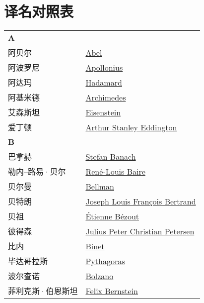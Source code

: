 \chapter{译名对照表}
\def\InsertTable#1{\begin{longtable}{ll} #1 \end{longtable}}%
\InsertTable{
	\textbf{A} \\
	阿贝尔 & \href{https://mathshistory.st-andrews.ac.uk/Biographies/Abel/}{Abel} \\
	阿波罗尼 & \href{https://mathshistory.st-andrews.ac.uk/Biographies/Apollonius/}{Apollonius} \\
	阿达玛 & \href{https://mathshistory.st-andrews.ac.uk/Biographies/Hadamard/}{Hadamard} \\
	阿基米德 & \href{https://mathshistory.st-andrews.ac.uk/Biographies/Archimedes/}{Archimedes} \\
	艾森斯坦 & \href{https://mathshistory.st-andrews.ac.uk/Biographies/Eisenstein/}{Eisenstein} \\
	爱丁顿 & \href{https://mathshistory.st-andrews.ac.uk/Biographies/Eddington/}{Arthur Stanley Eddington} \\
	\textbf{B} \\
	巴拿赫 & \href{https://mathshistory.st-andrews.ac.uk/Biographies/Banach/}{Stefan Banach} \\
	勒内--路易·贝尔 & \href{https://mathshistory.st-andrews.ac.uk/Biographies/Baire/}{Ren\'e-Louis Baire} \\
	贝尔曼 & \href{https://mathshistory.st-andrews.ac.uk/Biographies/Bellman/}{Bellman} \\
	贝特朗 & \href{https://mathshistory.st-andrews.ac.uk/Biographies/Bertrand/}{Joseph Louis Fran\c cois Bertrand} \\
	贝祖 & \href{https://mathshistory.st-andrews.ac.uk/Biographies/Bezout/}{\'Etienne B\'ezout} \\
	彼得森 & \href{https://mathshistory.st-andrews.ac.uk/Biographies/Petersen/}{Julius Peter Christian Petersen} \\
	比内 & \href{https://mathshistory.st-andrews.ac.uk/Biographies/Binet/}{Binet} \\
	毕达哥拉斯 & \href{https://mathshistory.st-andrews.ac.uk/Biographies/Pythagoras/}{Pythagoras} \\
	波尔查诺 & \href{https://mathshistory.st-andrews.ac.uk/Biographies/Bolzano/}{Bolzano} \\
	菲利克斯·伯恩斯坦 & \href{https://mathshistory.st-andrews.ac.uk/Biographies/Bernstein_Felix/}{Felix Bernstein} \\
}
